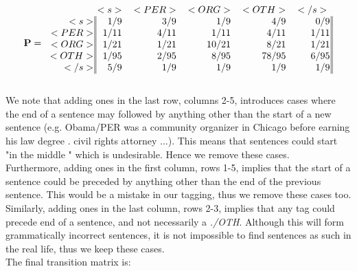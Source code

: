 \documentclass[12pt]{article}
\newenvironment{exercise}[2][Exercise]{\begin{trivlist}
\item[\hskip \labelsep {\bfseries #1}\hskip \labelsep {\bfseries #2.}]}{\end{trivlist}}
\begin{document}
\begin{exercise}{3. HMM Tagger}
\begin{enumerate}[label=(\alph*)]
\[
\mathbf{P} = 
        \begin{blockarray}{c@{\hspace{1pt}}rrrrr@{\hspace{3pt}}}
         & < s > & < PER > & < ORG > & < OTH > & < /s > \\
        \begin{block}{r@{\hspace{1pt}}|@{\hspace{1pt}}
    |@{\hspace{1pt}}rrrrr@{\hspace{1pt}}|@{\hspace{1pt}}|}
		< s >   & 1/9   & 3/9   & 1/9   & 4/9   & 0/9 \\
		< PER > & 1/11  & 4/11  & 1/11  & 4/11  & 1/11 \\
		< ORG > & 1/21  & 1/21  & 10/21 & 8/21  & 1/21\\
		< OTH > & 1/95  & 2/95  & 8/95  & 78/95 & 6/95 \\
		< /s >  & 5/9   & 1/9   & 1/9   & 1/9   & 1/9 \\
        \end{block}
    \end{blockarray}
\]

	We note that adding ones in the last row, columns 2-5, introduces cases where the end of a sentence may followed by anything other than the start of a new sentence (e.g. Obama/PER was a community organizer in Chicago before earning his law degree . civil rights attorney ...). This means that sentences could start "in the middle " which is undesirable. Hence we remove these cases. \\
	Furthermore, adding ones in the first column, rows 1-5, implies that the start of a sentence could be preceded by anything other than the end of the previous sentence. This would be a mistake in our tagging, thus we remove these cases too. \\
	
	Similarly, adding ones in the last column, rows 2-3, implies that any tag could precede end of a sentence, and not necessarily a \textit{./OTH}. Although this will form grammatically incorrect sentences, it is not impossible to find sentences as such in the real life, thus we keep these cases. \\
	
	The final transition matrix is:


\end{enumerate}
\end{exercise}
\end{document}
